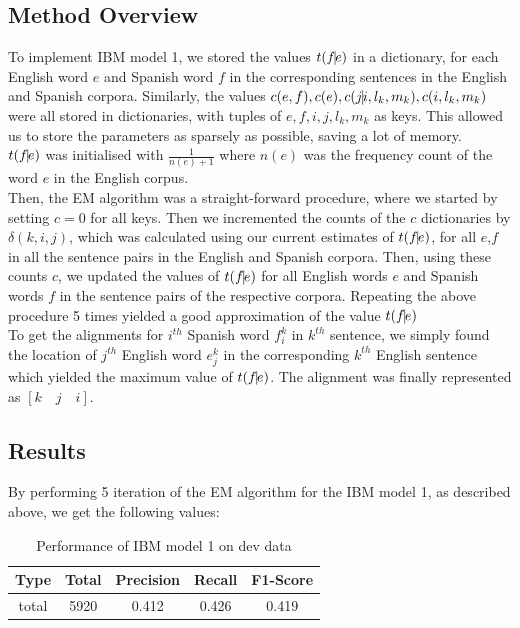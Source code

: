 \documentclass{article}
\begin{document}
	\subsection{Method Overview}
		To implement IBM model 1, we stored the values $t(f \vline e)$ in a dictionary, for each English word $e$ and Spanish word $f$ in the corresponding sentences in the English and Spanish corpora. Similarly, the values $c(e,f), c(e), c(j \vline i,l_{k},m_{k}), c(i,l_{k},m_{k})$ were all stored in dictionaries, with tuples of $e,f,i,j,l_{k},m_{k}$ as keys. This allowed us to store the parameters as sparsely as possible, saving a lot of memory. 
		\\$t(f \vline e)$ was initialised with $\frac{1}{n(e)+1}$ where $n(e)$ was the frequency count of the word $e$ in the English corpus.
		\\Then, the EM algorithm was a straight-forward procedure, where we started by setting $c=0$ for all keys. Then we incremented the counts of the $c$ dictionaries by $\delta(k,i,j)$, which was calculated using our current estimates of $t(f \vline e)$, for all $e$,$f$ in all the sentence pairs in the English and Spanish corpora. Then, using these counts $c$, we updated the values of $t(f \vline e)$ for all English words $e$ and Spanish words $f$ in the sentence pairs of the respective corpora. Repeating the above procedure 5 times yielded a good approximation of the value $t(f \vline e)$
		\\To get the alignments for $i^{th}$ Spanish word $f_{i}^{k}$ in $k^{th}$ sentence, we simply found the location of $j^{th}$ English word $e_{j}^{k}$ in the corresponding $k^{th}$ English sentence which yielded the maximum value of $t(f \vline e)$. The alignment was finally represented as $\left[k\quad j\quad i\right]$.
	\subsection{Results}
		By performing 5 iteration of the EM algorithm for the IBM model 1, as described above, we get the following values:
		\begin{table}[htbp]
			\center
			\begin{tabular}{|c|c|c|c|c|}
				\hline
				Type&Total&Precision&Recall&F1-Score\\
				\hline
				total&        5920&     0.412&        0.426&        0.419\\
				\hline
			\end{tabular}
			\caption{Performance of IBM model 1 on dev data}
		\end{table}
\end{document}
